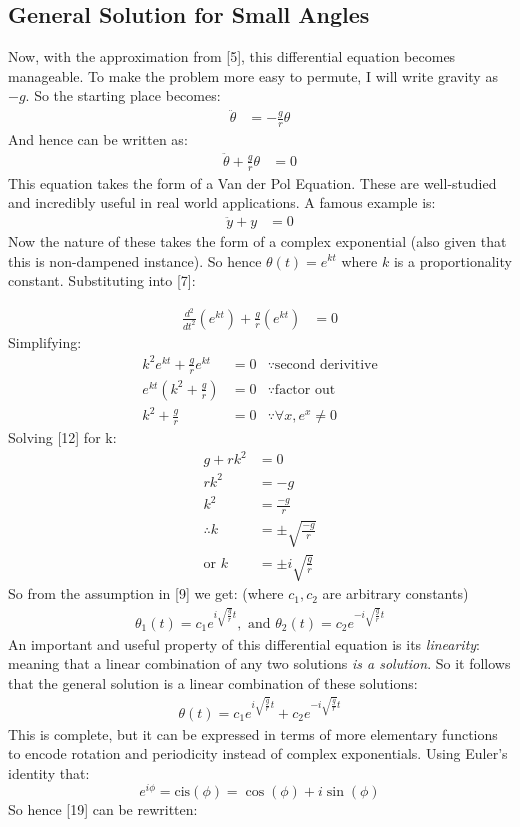 \documentclass[11pt,a4paper]{article}
\begin{document}
\subsection{General Solution for Small Angles}

Now,  with the approximation from [5],  this differential equation becomes manageable.  To make the problem more easy to permute,  I will write gravity as $-g$.  So the starting place becomes:
\begin{align}
\ddot{\theta} &= -\frac{g}{r}\theta
\end{align}
And hence can be written as:
\begin{align}
\ddot{\theta} + \frac{g}{r}\theta &= 0
\end{align}
This equation takes the form of a Van der Pol Equation.  These are well-studied and incredibly useful in real world applications.  A famous example is:
\begin{align}
\ddot{y} + y &= 0
\end{align}
Now the nature of these takes the form of a complex exponential (also given that this is non-dampened instance).  So hence $\theta(t) = e^{kt}$ where $k$ is a proportionality constant.  Substituting into [7]:

\begin{align}
\frac{d^2}{d t^2}(e^{kt}) + \frac{g}{r}(e^{kt}) &= 0
\end{align}
Simplifying:
\begin{align}
k^2e^{kt} + \frac{g}{r}e^{kt} &= 0 &\because \text{second derivitive}\\
e^{kt}(k^2 + \frac{g}{r}) &= 0 &\because \text{factor out}\\
k^2 + \frac{g}{r} &= 0 &\because \forall x,  e^x \neq 0 
\end{align}
Solving [12] for k:
\begin{align}
g+rk^2 &= 0 \\
rk^2 &= -g \\
k^2 &= \frac{-g}{r}  \\
\therefore k &= \pm \sqrt{\frac{-g}{r}}\\
\text{or } k &= \pm i\sqrt{\frac{g}{r}}
\end{align}
So from the assumption in [9] we get: (where $c_1, c_2$ are arbitrary constants)
\begin{align}
\theta_1(t) = c_1e^{  i\sqrt{\frac{g}{r}} t},  \text{ and } \theta_2(t) = c_2e^{  -i\sqrt{\frac{g}{r}} t}
\end{align}
An important and useful property of this differential equation is its \textit{linearity}: meaning that a linear combination of any two solutions \textit{is a solution}.  So it follows that the general solution is a linear combination of these solutions:
\begin{align}
\theta(t) = c_1e^{  i\sqrt{\frac{g}{r}} t} + c_2e^{  -i\sqrt{\frac{g}{r}} t}
\end{align}
This is complete,  but it can be expressed in terms of more elementary functions to encode rotation and periodicity instead of complex exponentials. Using Euler's identity that:
\[
e^{i \phi } = \text{cis} (\phi) = \cos(\phi)+ i \sin(\phi)
\]
So hence [19] can be rewritten:
\end{document}
